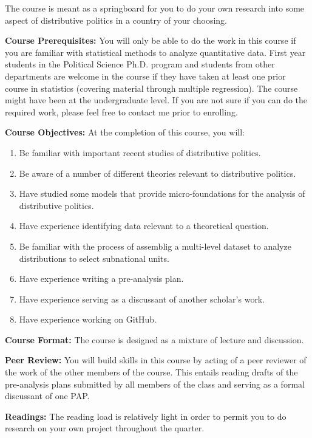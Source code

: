 \documentclass[11pt]{article}
\begin{document}
The course is meant as a springboard for you to do your own research into some aspect of distributive politics in a country
of your choosing. 


\textbf {\large Course Prerequisites:}  You will only be able to do the work in this course if you are familiar with 
statistical methods to analyze quantitative data. First year students in the Political Science Ph.D. 
program and students from other departments are welcome in the course if they have taken at least 
one prior course in statistics (covering material through multiple regression). The 
course might have been at the undergraduate level. If you are not sure if you can do the 
required work, please feel free to contact me prior to enrolling.


\textbf {\large Course Objectives:}  At the completion of this course, you will:
\begin{enumerate} [noitemsep]
  \item  Be familiar with important recent studies of distributive politics.
\item Be aware of a number of different theories relevant to distributive politics.
\item Have studied some models that provide micro-foundations for the analysis of distributive politics.
\item Have experience identifying data relevant to a theoretical question.
\item Be familiar with the process of assemblig a multi-level dataset to analyze distributions to select subnational units.
\item Have experience writing a pre-analysis plan. 
\item Have experience serving as a discussant of another scholar's work.
\item Have experience working on GitHub.
\end{enumerate}

\textbf{\large Course Format:} The course is designed as a mixture of lecture and discussion. 

\textbf{\large Peer Review:} You will build skills in this course by acting of a peer reviewer of the work of the
other members of the course. This entails reading drafts of the pre-analysis plans submitted by all members of the
class and serving as a formal discussant of one PAP.

\textbf {\large Readings:} The reading load is relatively light in order to permit you to do 
 research on your own project throughout the quarter.
\end{document}
